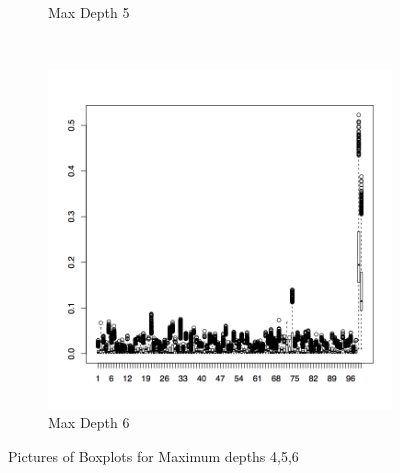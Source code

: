 \documentclass{article}
\begin{document}
\begin{figure}[H]
\begin{subfigure}[b]{0.3\textwidth}
                \caption{Max Depth 5}
                \label{fig:tiger}
        \end{subfigure}
        ~ %
        \begin{subfigure}[b]{0.3\textwidth}
                \centering
                \includegraphics[width=\textwidth]{c6_boxp}
                \caption{Max Depth 6}
                \label{fig:mouse}
        \end{subfigure}
        \caption{Pictures of Boxplots for Maximum depths 4,5,6}\label{fig:Boxplots456 }
\end{figure}
\end{document}
